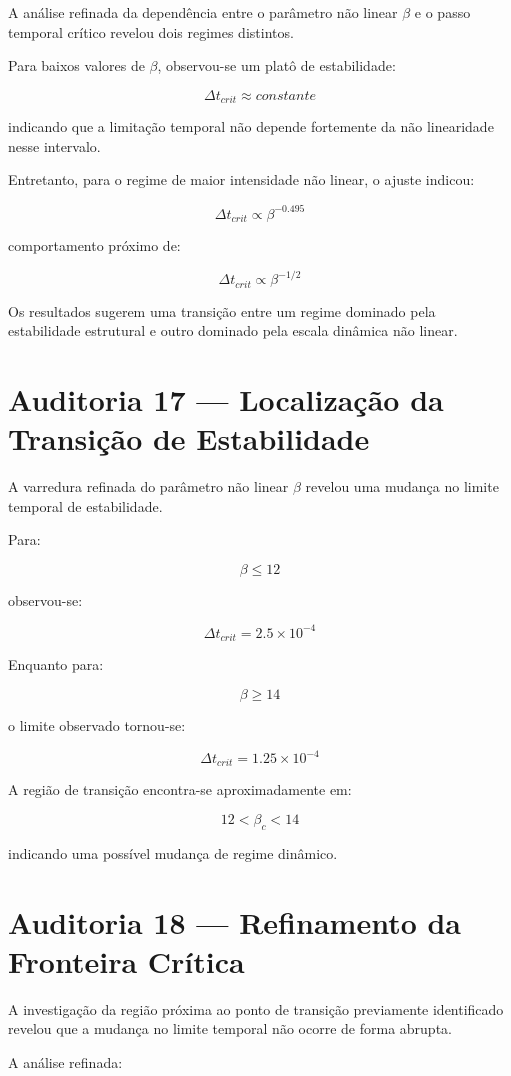 \documentclass[11pt,a4paper]{article}
\begin{document}
A análise refinada da dependência entre o parâmetro não linear
$\beta$ e o passo temporal crítico revelou dois regimes distintos.

Para baixos valores de $\beta$, observou-se um platô de estabilidade:

\[
\Delta t_{crit}\approx constante
\]

indicando que a limitação temporal não depende fortemente da
não linearidade nesse intervalo.

Entretanto, para o regime de maior intensidade não linear,
o ajuste indicou:

\[
\Delta t_{crit}\propto\beta^{-0.495}
\]

comportamento próximo de:

\[
\Delta t_{crit}\propto\beta^{-1/2}
\]

Os resultados sugerem uma transição entre um regime dominado
pela estabilidade estrutural e outro dominado pela escala
dinâmica não linear.
\section{Auditoria 17 — Localização da Transição de Estabilidade}

A varredura refinada do parâmetro não linear $\beta$ revelou uma
mudança no limite temporal de estabilidade.

Para:

\[
\beta \leq 12
\]

observou-se:

\[
\Delta t_{crit}=2.5\times10^{-4}
\]

Enquanto para:

\[
\beta \geq 14
\]

o limite observado tornou-se:

\[
\Delta t_{crit}=1.25\times10^{-4}
\]

A região de transição encontra-se aproximadamente em:

\[
12 < \beta_c < 14
\]

indicando uma possível mudança de regime dinâmico.
\section{Auditoria 18 — Refinamento da Fronteira Crítica}

A investigação da região próxima ao ponto de transição
previamente identificado revelou que a mudança no limite temporal
não ocorre de forma abrupta.

A análise refinada:
\end{document}

